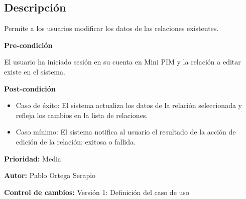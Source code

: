 
\subsection*{Descripción}
Permite a los usuarios modificar los datos de las relaciones existentes.\par
\vspace{0.15cm}

\textbf{Pre-condición}\par
El usuario ha iniciado sesión en su cuenta en Mini PIM y la relación a editar existe en el sistema.\par
\vspace{0.15cm}

\textbf{Post-condición}
\begin{itemize}
    \item Caso de éxito: El sistema actualiza los datos de la relación seleccionada y refleja los cambios en la lista de relaciones.
    \item Caso mínimo: El sistema notifica al usuario el resultado de la acción de edición de la relación: exitosa o fallida.
\end{itemize}

\textbf{Prioridad: }
Media
\vspace{0.15cm}

\textbf{Autor: }
Pablo Ortega Serapio\par
\vspace{0.15cm}

\textbf{Control de cambios: } Versión 1: Definición del caso de uso


